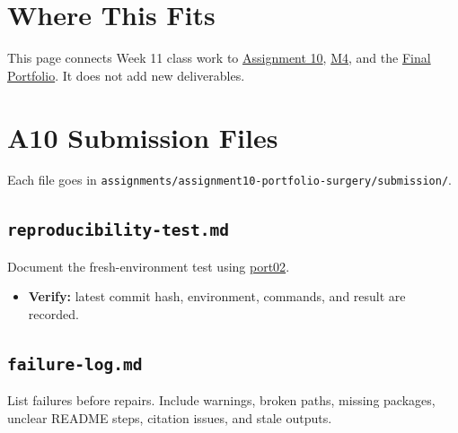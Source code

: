 \documentclass[
  letterpaper,
  DIV=11,
  numbers=noendperiod,
  oneside]{scrreprt}
\providecommand{\tightlist}{%
  \setlength{\itemsep}{0pt}\setlength{\parskip}{0pt}}
\begin{document}

\section*{Where This Fits}\label{where-this-fits-25}


This page connects Week 11 class work to
\href{../../assignments/assignment10-portfolio-surgery/README.md}{Assignment
10}, \href{../../milestones/m4-peer-review/README.md}{M4}, and the
\href{../../milestones/final-portfolio/README.md}{Final Portfolio}. It
does not add new deliverables.

\section*{A10 Submission Files}\label{a10-submission-files}


Each file goes in
\texttt{assignments/assignment10-portfolio-surgery/submission/}.

\subsection*{\texorpdfstring{\texttt{reproducibility-test.md}}{reproducibility-test.md}}\label{reproducibility-test.md}

Document the fresh-environment test using
\hyperref[fresh-codespace-test]{port02}.

\begin{itemize}
\tightlist
\item
  \textbf{Verify:} latest commit hash, environment, commands, and result
  are recorded.
\end{itemize}

\subsection*{\texorpdfstring{\texttt{failure-log.md}}{failure-log.md}}\label{failure-log.md}

List failures before repairs. Include warnings, broken paths, missing
packages, unclear README steps, citation issues, and stale outputs.
\end{document}
